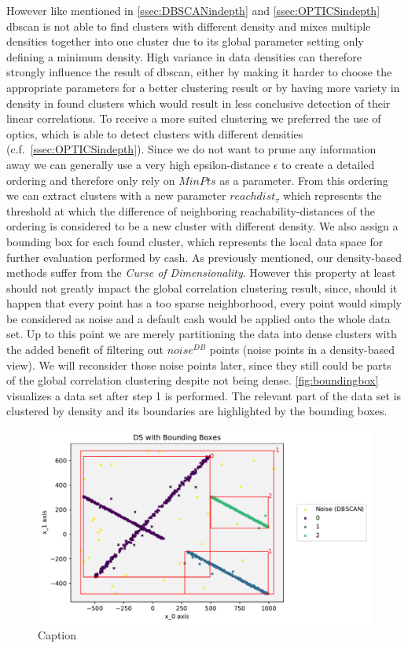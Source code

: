 However like mentioned in \autoref{ssec:DBSCANindepth} and \autoref{ssec:OPTICSindepth} \gls{dbscan} is not able to find clusters with different density and mixes multiple densities together into one cluster due to its global parameter setting only defining a minimum density. High variance in data densities can therefore strongly influence the result of \gls{dbscan}, either by making it harder to choose the appropriate parameters for a better clustering result or by having more variety in density in found clusters which would result in less conclusive detection of their linear correlations. 
To receive a more suited clustering we preferred the use of \gls{optics}, which is able to detect clusters with different densities (c.f.~\autoref{ssec:OPTICSindepth}). Since we do not want to prune any information away we can generally use a very high epsilon-distance $\epsilon$ to create a detailed ordering and therefore only rely on $MinPts$ as a parameter. From this ordering we can extract clusters with a new parameter $reachdist_{\tau}$ which represents the threshold at which the difference of neighboring reachability-distances of the ordering is considered to be a new cluster with different density. We also assign a bounding box for each found cluster, which represents the local data space for further evaluation performed by \gls{cash}. As previously mentioned, our density-based methods suffer from the \textit{Curse of Dimensionality}. However this property at least should not greatly impact the global correlation clustering result, since, should it happen that every point has a too sparse neighborhood, every point would simply be considered as noise and a default \gls{cash} would be applied onto the whole data set. Up to this point we are merely partitioning the data into dense clusters with the added benefit of filtering out $noise^{DB}$ points (noise points in a density-based view). We will reconsider those noise points later, since they still could be parts of the global correlation clustering despite not being dense. \autoref{fig:boundingbox} visualizes a data set after step 1 is performed. The relevant part of the data set is clustered by density and its boundaries are highlighted by the bounding boxes.

\begin{figure}
    \centering
    \includegraphics[width=.6\textwidth]{figures_method/DSwithBoundingBoxes.pdf}
    \caption{Caption}
    \label{fig:boundingbox}
\end{figure}


